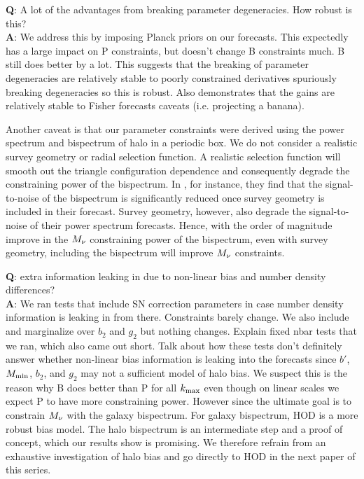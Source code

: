 {\bf Q}: A lot of the advantages from breaking parameter degeneracies. How robust is this? \\
{\bf A}: We address this by imposing Planck priors on our forecasts. This expectedly has a 
large impact on P constraints, but doesn't change B constraints much. B still does better 
by a lot. This suggests that the breaking of parameter degeneracies are relatively stable 
to poorly constrained derivatives spuriously breaking degeneracies so this is robust. Also 
demonstrates that the gains are relatively stable to Fisher forecasts caveats 
(i.e. projecting a banana). 

Another caveat is that our parameter constraints were derived using the power 
spectrum and bispectrum of halo in a periodic box. We do not consider a 
realistic survey geometry or radial selection function. A realistic selection 
function will smooth out the triangle configuration dependence and consequently 
degrade the constraining power of the bispectrum. In \cite{sefusatti2005}, for 
instance, they find that the signal-to-noise of the bispectrum is significantly 
reduced once survey geometry is included in their forecast. Survey geometry, 
however, also degrade the signal-to-noise of their power spectrum forecasts. 
Hence, with the order of magnitude improve in the $M_\nu$ constraining power 
of the bispectrum, even with survey geometry, including the bispectrum will 
improve $M_\nu$ constraints. 

{\bf Q}: extra information leaking in due to non-linear bias and number density differences? \\
{\bf A}: We ran tests that include SN correction parameters in case number density 
information is leaking in from there. Constraints barely change. We also include and marginalize 
over $b_2$ and $g_2$ but nothing changes. Explain fixed nbar tests that we ran, which also came 
out short. Talk about how these tests don't definitely answer whether non-linear bias information
is leaking into the forecasts since $b'$, $M_{\rm min}$, $b_2$, and $g_2$ may not a sufficient
model of halo bias. We suspect this is the reason why B does better than P for all $k_{\rm max}$ 
even though on linear scales we expect P to have more constraining power. 
However since the ultimate goal is to constrain $M_\nu$ with the galaxy 
bispectrum.  For galaxy bispectrum, HOD is a more robust bias model. The halo bispectrum is an
intermediate step and a proof of concept, which our results show is promising. We therefore 
refrain from an exhaustive investigation of halo bias and go directly to HOD in the next paper 
of this series.

